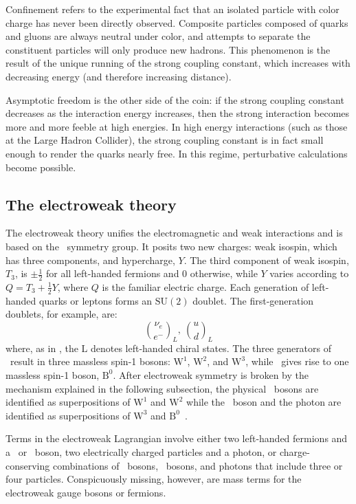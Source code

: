 Confinement refers to the experimental fact that an isolated particle with color charge has never been directly observed. Composite particles composed of quarks and gluons are always neutral under color, and attempts to separate the constituent particles will only produce new hadrons. This phenomenon is the result of the unique running of the strong coupling constant, which increases with decreasing energy (and therefore increasing distance).

Asymptotic freedom is the other side of the coin: if the strong coupling constant decreases as the interaction energy increases, then the strong interaction becomes more and more feeble at high energies. In high energy interactions (such as those at the Large Hadron Collider), the strong coupling constant is in fact small enough to render the quarks nearly free. In this regime, perturbative calculations become possible.

\subsection{The electroweak theory}
The electroweak theory unifies the electromagnetic and weak interactions and is based on the \ewsymm\ symmetry group. It posits two new charges: weak isospin, which has three components, and hypercharge, $Y$. The third component of weak isospin, $T_{3}$, is $\pm\frac{1}{2}$ for all left-handed fermions and 0 otherwise, while $Y$ varies according to $Q=T_{3}+\frac{1}{2}Y$, where $Q$ is the familiar electric charge. Each generation of left-handed quarks or leptons forms an $\mathrm{SU}(2)$ doublet. The first-generation doublets, for example, are:
\begin{equation}
    \binom{\nu_{e}}{e^{-}}_{L},\ \binom{u}{d}_{L}
\end{equation}
where, as in \sutwol, the $\mathrm{L}$ denotes left-handed chiral states. The three generators of \sutwol\ result in three massless spin-1 bosons: $\mathrm{W}^{1}$, $\mathrm{W}^{2}$, and $\mathrm{W}^{3}$, while \uoney\ gives rise to one massless spin-1 boson, $\mathrm{B}^{0}$. After electroweak symmetry is broken by the mechanism explained in the following subsection, the physical \PWpm\ bosons are identified as superpositions of $\mathrm{W}^{1}$ and $\mathrm{W}^{2}$ while the \cPZ\ boson and the photon are identified as superpositions of $\mathrm{W}^{3}$ and $\mathrm{B}^{0}$~\cite{weinberg_leptons}.

Terms in the electroweak Lagrangian involve either two left-handed fermions and a \PWpm\ or \cPZ\ boson, two electrically charged particles and a photon, or charge-conserving combinations of \PWpm\ bosons, \cPZ\ bosons, and photons that include three or four particles. Conspicuously missing, however, are mass terms for the electroweak gauge bosons or fermions.

